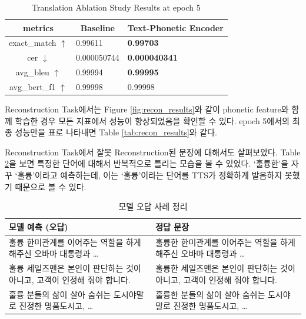 \documentclass[letterpaper]{article} %
\begin{document}
\begin{table}[t]
    \begin{tabular}{cll}
        \textbf{metrics}         & \multicolumn{1}{c}{\textbf{Baseline}} & \multicolumn{1}{c}{\textbf{Text-Phonetic Encoder}} \\ \hline
        exact\_match $\uparrow$  & 0.99611                               & \textbf{0.99703}                             \\
        cer $\downarrow$         & 0.000050744                           & \textbf{0.000040341}                         \\
        avg\_bleu $\uparrow$     & 0.99994                               & \textbf{0.99995}                             \\
        avg\_bert\_f1 $\uparrow$ & 0.99998                               & 0.99998
    \end{tabular}
    \caption{Translation Ablation Study Results at epoch 5}
    \label{tab:trans_results}
\end{table}


Reconstruction Task에서는 Figure \ref{fig:recon_results}와 같이 phonetic feature와 함께 학습한 경우 모든 지표에서 성능이 향상되었음을 확인할 수 있다. epoch 5에서의 최종 성능만을 표로 나타내면 Table \ref{tab:recon_results}와 같다.

Reconstruction Task에서 잘못 Reconstruction된 문장에 대해서도 살펴보았다. Table \ref{tab:wrong_cases}을 보면 특정한 단어에 대해서 반복적으로 틀리는 모습을 볼 수 있었다. `훌륭한'을 자꾸 `훌륭'이라고 예측하는데, 이는 `훌륭'이라는 단어를 TTS가 정확하게 발음하지 못했기 때문으로 볼 수 있다.

\begin{table}[h]
    \centering
    \begin{tabular}{|p{7cm}|p{7cm}|}
        \hline
        \textbf{모델 예측 (오답)}                       & \textbf{정답 문장}                             \\
        \hline
        훌륭 한미관계를 이어주는 역할을 하게 해주신 오바마 대통령과 \dots   & 훌륭한 한미관계를 이어주는 역할을 하게 해주신 오바마 대통령과 \dots   \\
        \hline
        훌륭 세일즈맨은 본인이 판단하는 것이 아니고, 고객이 인정해 줘야 합니다. & 훌륭한 세일즈맨은 본인이 판단하는 것이 아니고, 고객이 인정해 줘야 합니다. \\
        \hline
        훌륭 분들의 삶이 살아 숨쉬는 도시야말로 진정한 명품도시고, \dots   & 훌륭한 분들의 삶이 살아 숨쉬는 도시야말로 진정한 명품도시고, \dots   \\
        \hline
    \end{tabular}
    \caption{모델 오답 사례 정리}
    \label{tab:wrong_cases}
\end{table}
\end{document}

